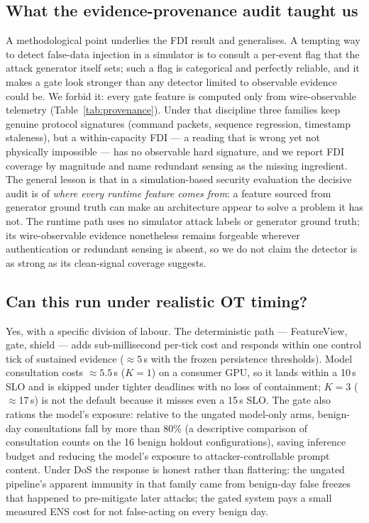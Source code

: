 \subsection{What the evidence-provenance audit taught us}
\label{sec:disc-provenance}
A methodological point underlies the FDI result and generalises. A
tempting way to detect false-data injection in a simulator is to consult a
per-event flag that the attack generator itself sets; such a flag is
categorical and perfectly reliable, and it makes a gate look stronger than
any detector limited to observable evidence could be. We forbid it: every gate feature is
computed only from wire-observable telemetry (Table~\ref{tab:provenance}).
Under that discipline three families keep genuine protocol signatures
(command packets, sequence regression, timestamp staleness), but a
within-capacity FDI --- a reading that is wrong yet not physically
impossible --- has no observable hard signature, and we report FDI coverage
by magnitude and name redundant sensing as the missing ingredient. The
general lesson is that in a simulation-based security evaluation the
decisive audit is of \emph{where every runtime feature comes from}: a
feature sourced from generator ground truth can make an architecture appear
to solve a problem it has not. The runtime path uses no simulator attack labels
or generator ground truth; its wire-observable evidence nonetheless remains
forgeable wherever authentication or redundant sensing is absent, so we do not
claim the detector is as strong as its clean-signal coverage suggests.

\subsection{Can this run under realistic OT timing?}
\label{sec:disc-timing}
Yes, with a specific division of labour. The deterministic path ---
FeatureView, gate, shield --- adds sub-millisecond per-tick cost and
responds within one control tick of sustained evidence
(${\approx}5$\,s with the frozen persistence thresholds). Model
consultation costs ${\approx}5.5$\,s ($K{=}1$) on a consumer GPU, so it
lands within a 10\,s SLO and is skipped under tighter deadlines with no
loss of containment; $K{=}3$ ($\approx$17\,s) is not the default because
it misses even a 15\,s SLO. The gate also rations the model's exposure: relative to the ungated model-only
arms, benign-day consultations fall by more than 80\% (a descriptive comparison
of consultation counts on the 16 benign holdout configurations), saving inference
budget and reducing the model's exposure to attacker-controllable prompt content.
Under DoS the response is honest rather than flattering: the ungated pipeline's
apparent immunity in that family came from benign-day false freezes that happened
to pre-mitigate later attacks; the gated system pays a small measured ENS cost
for not false-acting
on every benign day.


